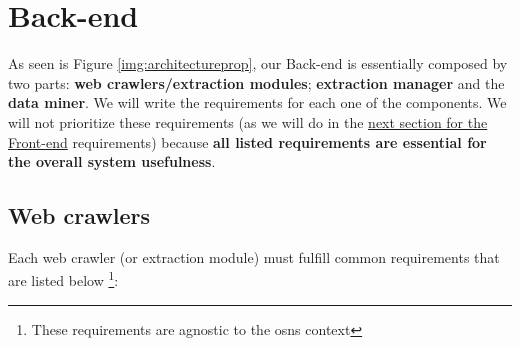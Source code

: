 \section{Back-end}

As seen is Figure \ref{img:architectureprop}, our Back-end is essentially composed by two parts: \textbf{web crawlers/extraction modules}; \textbf{extraction manager} and the \textbf{data miner}. We will write the requirements for each one of the components. We will not prioritize these requirements (as we will do in the \hyperref[sec:frontend]{next section for the Front-end} requirements) because \textbf{all listed requirements are essential for the overall system usefulness}.

\subsection{Web crawlers}

Each web crawler (or extraction module) must fulfill common requirements that are listed below \footnote{These requirements are agnostic to the \glspl{osn} context}:

